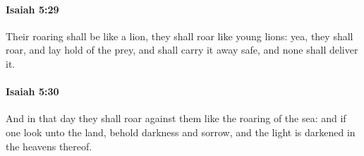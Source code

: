 		\paragraph{Isaiah 5:29} %
			\label{ISAIAH-5-29}

			Their roaring shall be like a lion, they shall roar like young lions: yea, they shall roar, and lay hold of the prey, and shall carry it away safe, and none shall deliver it.


		\paragraph{Isaiah 5:30} %
			\label{ISAIAH-5-30}

			And in that day they shall roar against them like the roaring of the sea: and if one look unto the land, behold darkness and sorrow, and the light is darkened in the heavens thereof.

